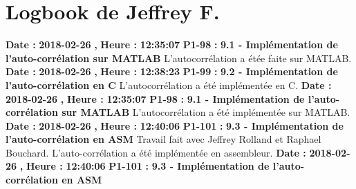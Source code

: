 \documentclass{article}%
\begin{document}
\section{Logbook de Jeffrey F.}%
\textbf{Date : }%
\textbf{2018{-}02{-}26}%
\textbf{,}%
\textbf{ Heure : }%
\textbf{12:35:07}%
\newline%
%
\textbf{P1{-}98 }%
\textbf{ : }%
\textbf{ 9.1 {-} Implémentation de l'auto{-}corrélation sur MATLAB}%
\newline%
\newline%
%
L'autocorrélation a étée faite sur MATLAB.\newline%
\newline%
%
\textbf{Date : }%
\textbf{2018{-}02{-}26}%
\textbf{,}%
\textbf{ Heure : }%
\textbf{12:38:23}%
\newline%
%
\textbf{P1{-}99 }%
\textbf{ : }%
\textbf{ 9.2 {-} Implémentation de l'auto{-}corrélation en C}%
\newline%
\newline%
%
L'autocorrélation a été implémentée en C.\newline%
\newline%
%
\textbf{Date : }%
\textbf{2018{-}02{-}26}%
\textbf{,}%
\textbf{ Heure : }%
\textbf{12:35:07}%
\newline%
%
\textbf{P1{-}98 }%
\textbf{ : }%
\textbf{ 9.1 {-} Implémentation de l'auto{-}corrélation sur MATLAB}%
\newline%
\newline%
%
L'autocorrélation a été implémentée sur MATLAB.\newline%
\newline%
%
\textbf{Date : }%
\textbf{2018{-}02{-}26}%
\textbf{,}%
\textbf{ Heure : }%
\textbf{12:40:06}%
\newline%
%
\textbf{P1{-}101 }%
\textbf{ : }%
\textbf{ 9.3 {-} Implémentation de l'auto{-}corrélation en ASM}%
\newline%
\newline%
%
Travail fait avec Jeffrey Rolland et Raphael Bouchard.\newline%
L'auto{-}corrélation a été implémentée en assembleur.\newline%
\newline%
%
\textbf{Date : }%
\textbf{2018{-}02{-}26}%
\textbf{,}%
\textbf{ Heure : }%
\textbf{12:40:06}%
\newline%
%
\textbf{P1{-}101 }%
\textbf{ : }%
\textbf{ 9.3 {-} Implémentation de l'auto{-}corrélation en ASM}%
\newline%
\newline%
\end{document}
